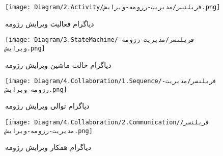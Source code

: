 \begin{figure}[H]
	\texttt{[image: Diagram/2.Activity/فریلنسر/مدیریت-رزومه-ویرایش.png]}
	\centering
	\caption{دیاگرام فعالیت ویرایش رزومه}
	\label{fig:a:ویرایش-رزومه}
\end{figure}
\begin{figure}[H]
	\texttt{[image: Diagram/3.StateMachine/فریلنسر/مدیریت-رزومه-ویرایش.png]}
	\centering
	\caption{دیاگرام حالت ماشین ویرایش رزومه}
	\label{fig:sm:ویرایش-رزومه}
\end{figure}
\begin{figure}[H]
	\texttt{[image: Diagram/4.Collaboration/1.Sequence/فریلنسر/مدیریت-رزومه-ویرایش.png]}
	\caption{دیاگرام توالی ویرایش رزومه}
	\centering
	\label{fig:s:ویرایش-رزومه}
\end{figure}
\begin{figure}[H]
	\texttt{[image: Diagram/4.Collaboration/2.Communication/فریلنسر/مدیریت-رزومه-ویرایش.png]}
	\centering
	\caption{دیاگرام همکار ویرایش رزومه}
	\label{fig:c:ویرایش-رزومه}
\end{figure}
